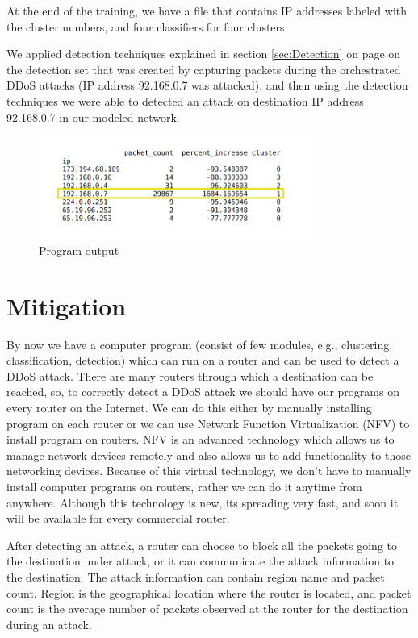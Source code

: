 \documentclass[12pt,oneside,a4paper]{article}
\begin{document}
At the end of the training, we have a file that contains IP addresses labeled with the cluster numbers, and four classifiers for four clusters.

We applied detection techniques explained in section \ref{sec:Detection} on page \pageref{sec:Detection} on the detection set that was created by capturing packets during the orchestrated DDoS attacks (IP address 92.168.0.7 was attacked), and then using the detection techniques we were able to detected an attack on destination IP address 92.168.0.7 in our modeled network.

\begin{figure}[H]
\centering
\includegraphics[width=0.80\textwidth]{detected_IP.png}
\caption{Program output} \label{fig:detected_IP}
\end{figure}
\pagebreak
\section{Mitigation}

By now we have a computer program (consist of few modules, e.g., clustering, classification, detection) which can run on a router and can be used to detect a DDoS attack. There are many routers through which a destination can be reached, so, to correctly detect a DDoS attack we should have our programs on every router on the Internet. We can do this either by manually installing program on each router or we can use Network Function Virtualization (NFV)\cite{nfv} to install program on routers. NFV is an advanced technology which allows us to manage network devices remotely and also allows us to add functionality to those networking devices. Because of this virtual technology, we don't have to manually install computer programs on routers, rather we can do it anytime from anywhere. Although this technology is new, its spreading very fast, and soon it will be available for every commercial router.

After detecting an attack, a router can choose to block all the packets going to the destination under attack, or it can communicate the attack information to the destination. The attack information can contain region name and packet count. Region is the geographical location where the router is located, and packet count is the average number of packets observed at the router for the destination during an attack.
\end{document}
